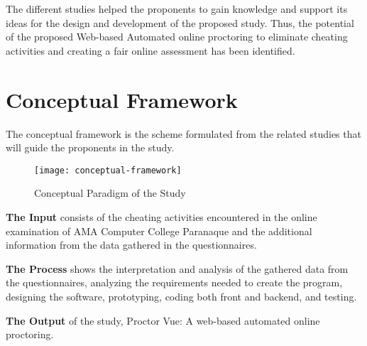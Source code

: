 The different studies helped the proponents to gain knowledge and support its ideas for the design and development of the proposed study.
Thus, the potential of the proposed Web-based Automated online proctoring to eliminate cheating activities and creating a fair online assessment has been identified.

\section{Conceptual Framework}

The conceptual framework is the scheme formulated from the related studies that will guide the proponents in the study.

\pagebreak

\begin{figure}[h!]
   \begin{center}
      \texttt{[image: conceptual-framework]}
      \caption{Conceptual Paradigm of the Study}
   \end{center}
\end{figure}

\textbf{The Input} consists of the cheating activities encountered in the online examination of AMA Computer College Paranaque and the additional information from the data gathered in the questionnaires.

\textbf{The Process} shows the interpretation and analysis of the gathered data from the questionnaires, analyzing the requirements needed to create the program, designing the software, prototyping, coding both front and backend, and testing.

\textbf{The Output} of the study, Proctor Vue: A web-based automated online proctoring.

